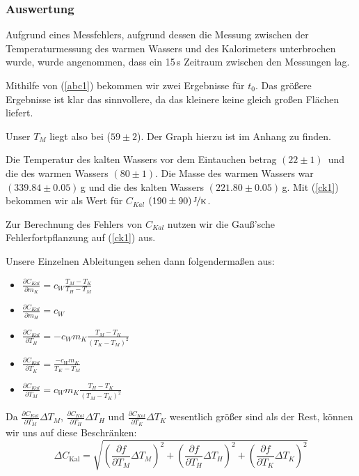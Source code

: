\documentclass[11pt,a4paper]{article}
\begin{document}
\subsubsection{Auswertung}

Aufgrund eines Messfehlers, aufgrund dessen die Messung zwischen der Temperaturmessung des warmen Wassers und des Kalorimeters unterbrochen wurde, wurde angenommen, dass ein 15\,s Zeitraum zwischen den Messungen lag.

Mithilfe von (\ref{abc1}) bekommen wir zwei Ergebnisse f\"ur $t_0$. Das gr\"o\ss ere Ergebnisse ist klar das sinnvollere, da das kleinere keine gleich gro\ss en Fl\"achen liefert.

Unser $T_M$ liegt also bei ($59\pm2$)\celsius. Der Graph hierzu ist im Anhang zu finden.

Die Temperatur des kalten Wassers vor dem Eintauchen betrag $(22\pm1)$\celsius \ und die des warmen Wassers $(80\pm1)$\celsius. Die Masse des warmen Wassers war $(339.84\pm0.05)$\,g und die des kalten Wassers $(221.80\pm0.05)$\,g. Mit (\ref{ck1}) bekommen wir als Wert f\"ur $C_{Kal}$ $(190\pm90)\,\nicefrac{\mathrm{J}}{\mathrm{K}}$.

Zur Berechnung des Fehlers von $C_{Kal}$ nutzen wir die Gau\ss 'sche Fehlerfortpflanzung auf (\ref{ck1}) aus.

Unsere Einzelnen Ableitungen sehen dann folgenderma\ss en aus:

\begin{itemize}
\item $ \frac{\partial C_{Kal}}{\partial m_K} = c_W\frac{T_M-T_K}{T_H-T_M}$
\item $ \frac{\partial C_{Kal}}{\partial m_H} = c_W$
\item $ \frac{\partial C_{Kal}}{\partial T_H} = -c_W m_K \frac{T_M - T_K}{(T_K-T_M)^2} $
\item $ \frac{\partial C_{Kal}}{\partial T_K} = \frac{-c_W m_K}{T_K-T_M} $
\item $ \frac{\partial C_{Kal}}{\partial T_M} = c_W m_K \frac{T_H-T_K}{(T_M-T_K)^2} $
\end{itemize}

Da  $\frac{\partial C_{Kal}}{\partial T_M} \Delta T_M$, $\frac{\partial C_{Kal}}{\partial T_H} 
\Delta T_H$ und $\frac{\partial C_{Kal}}{\partial T_K} \Delta T_K$ wesentlich gr\"o\ss er sind als der Rest, k\"onnen wir uns auf diese Beschr\"anken:
\begin{equation}\Delta C_\textrm{Kal} = \sqrt{\left({\frac{\partial f}{\partial T_M} \Delta T_M}\right)^2+\left({\frac{\partial f}{\partial T_H} \Delta T_H}\right)^2+\left({\frac{\partial f}{\partial T_K} \Delta T_K}\right)^2 }
\end{equation}
\end{document}
